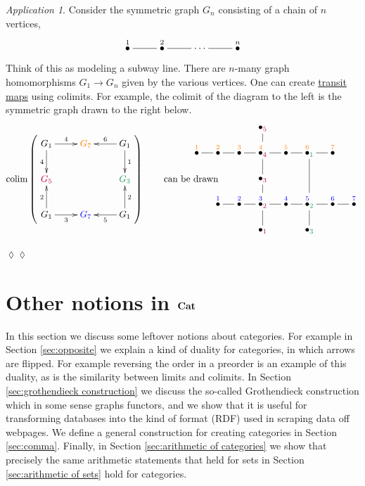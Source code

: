 \documentclass{book}
\def\tn{\textnormal}
\def\to{\rightarrow}
\newcommand{\LMO}[1]{\stackrel{#1}{\bullet}}
\def\Cat{{\bf Cat}}
\def\colim{\mathop{\tn{colim}}}
\theoremstyle{remark}
\newtheorem{app}[subsubsection]{Application}
\newenvironment{application}{\begin{app}}{\hspace*{\fill}$\lozenge\lozenge$\end{app}}
\theoremstyle{definition}
\begin{document}
\begin{application}

Consider the symmetric graph $G_n$ consisting of a chain of $n$ vertices, 
$$\xymatrix{\LMO{1}\ar@{-}[r]&\LMO{2}\ar@{-}[r]&\cdots\ar@{-}[r]&\LMO{n}}$$
Think of this as modeling a subway line. There are $n$-many graph homomorphisms $G_1\to G_n$ given by the various vertices. One can create \href{http://en.wikipedia.org/wiki/Transit_map}{\text transit maps} using colimits. For example, the colimit of the diagram to the left is the symmetric graph drawn to the right below.
$$
\colim\left(\parbox{1.2in}{
\xymatrix{
G_1\ar[r]^4\ar[d]_4&\color{orange}{G_7}&G_1\ar[l]_6\ar[d]^1\\
\color{purple}{G_5}&&\color{ForestGreen}{G_3}\\
G_1\ar[u]^2\ar[r]_3&\color{blue}{G_7}&G_1\ar[u]_2\ar[l]^5
}}\right)
\hspace{.3in}\tn{can be drawn}\hspace{-.4in}
\parbox{3in}{\xymatrix@=12pt{
&&&\bullet_{\color{purple}{5}}\ar@{-}[d]\\
\LMO{{\color{orange}{1}}}\ar@{-}[r]&\LMO{{\color{orange}{2}}}\ar@{-}[r]&\LMO{{\color{orange}{3}}}\ar@{-}[r]&\LMO{{\color{orange}{4}}}_{\color{purple}{4}}\ar@{-}[r]\ar@{-}[d]&\LMO{{\color{orange}{5}}}\ar@{-}[r]&\LMO{{\color{orange}{6}}}_{\color{ForestGreen}{1}}\ar@{-}[r]\ar@{-}[dd]&\LMO{{\color{orange}{7}}}\\
&&&\bullet_{\color{purple}{3}}\ar@{-}[d]\\
&\LMO{{\color{blue}{1}}}\ar@{-}[r]&\LMO{{\color{blue}{2}}}\ar@{-}[r]&\LMO{{\color{blue}{3}}}_{\color{purple}{2}}\ar@{-}[r]\ar@{-}[d]&\LMO{{\color{blue}{4}}}\ar@{-}[r]&\LMO{{\color{blue}{5}}}_{\color{ForestGreen}{2}}\ar@{-}[d]\ar@{-}[r]&\LMO{{\color{blue}{6}}}\ar@{-}[r]&\LMO{{\color{blue}{7}}}\\
&&&\bullet_{\color{purple}{1}}&&\bullet_{\color{ForestGreen}{3}}}}
$$ 

\end{application}



\section{Other notions in $\Cat$}

In this section we discuss some leftover notions about categories. For example in Section \ref{sec:opposite} we explain a kind of duality for categories, in which arrows are flipped. For example reversing the order in a preorder is an example of this duality, as is the similarity between limits and colimits. In Section \ref{sec:grothendieck construction} we discuss the so-called Grothendieck construction which in some sense graphs functors, and we show that it is useful for transforming databases into the kind of format (RDF) used in scraping data off webpages. We define a general construction for creating categories in Section \ref{sec:comma}. Finally, in Section \ref{sec:arithmetic of categories} we show that precisely the same arithmetic statements that held for sets in Section \ref{sec:arithmetic of sets} hold for categories. 
\end{document}
